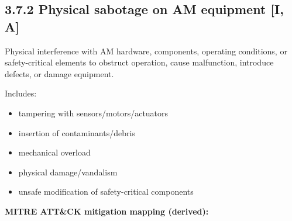 \documentclass[10pt,a4paper,oneside]{report}
\begin{document}
\subsection{3.7.2 Physical sabotage on AM equipment [I, A]}


Physical interference with AM hardware, components, operating conditions, or safety-critical elements to obstruct operation, cause malfunction, introduce defects, or damage equipment.

Includes:

\begin{itemize}
\item tampering with sensors/motors/actuators
\item insertion of contaminants/debris
\item mechanical overload
\item physical damage/vandalism
\item unsafe modification of safety-critical components
\end{itemize}

\textbf{MITRE ATT\&CK mitigation mapping (derived):}
\end{document}
